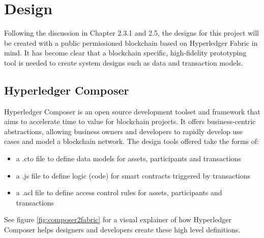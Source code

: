 \chapter{Design}
\graphicspath{{Chapter5/Figs/Raster/}{Chapter5/Figs/}}

Following the discussion in Chapter 2.3.1 and 2.5, the designs for this project 
will be created with a public permissioned blockchain based on Hyperledger Fabric in mind.
It has become clear that a blockchain specific, high-fidelity prototyping tool is needed 
to create system designs such as data and transaction models.

\section*{Hyperledger Composer}

Hyperledger Composer is an open source development toolset and framework that aims to 
accelerate time to value for blockchain projects. It offers business-centric 
abstractions, allowing business owners and developers to rapidly develop 
use cases and model a blockchain network. The design tools offered take the forms of:
\begin{itemize}
    \setlength\itemsep{0em}            
    \item a .cto file to define data models for assets, participants and transactions
    \item a .js file to define logic (code) for smart contracts triggered by transactions
    \item a .acl file to define access control rules for assets, participants and transactions\\
    \citep{official2018composer}
\end{itemize}

See figure \ref{fig:composer2fabric} for a visual explainer of how Hyperledger Composer 
helps designers and developers create these high level definitions.

